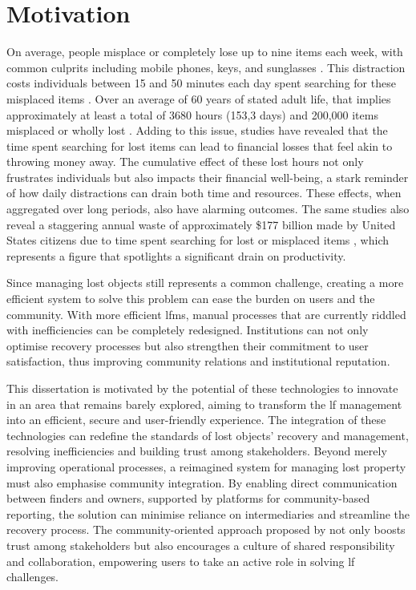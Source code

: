 \section{Motivation} \label{section:motivation}

On average, people misplace or completely lose up to nine items each week, with common culprits including mobile phones, keys, and sunglasses \cite{Prawira2024}. This distraction costs individuals between 15 and 50 minutes each day spent searching for these misplaced items \cites{Prawira2024, Knierim2012}. Over an average of 60 years of stated adult life, that implies approximately at least a total of 3680 hours (153,3 days) and 200,000 items misplaced or wholly lost \cite{Ahmad2015}. Adding to this issue, studies have revealed that the time spent searching for lost items can lead to financial losses that feel akin to throwing money away. The cumulative effect of these lost hours not only frustrates individuals but also impacts their financial well-being, a stark reminder of how daily distractions can drain both time and resources. These effects, when aggregated over long periods, also have alarming outcomes. The same studies also reveal a staggering annual waste of approximately \$177 billion made by United States citizens \cite{Newswire2010} due to time spent searching for lost or misplaced items \cite{Ahmad2015}, which represents a figure that spotlights a significant drain on productivity.

Since managing lost objects still represents a common challenge, creating a more efficient system to solve this problem can ease the burden on users and the community. With more efficient \ac{lfms}, manual processes that are currently riddled with inefficiencies can be completely redesigned. Institutions can not only optimise recovery processes but also strengthen their commitment to user satisfaction, thus improving community relations and institutional reputation.

This dissertation is motivated by the potential of these technologies to innovate in an area that remains barely explored, aiming to transform the \ac{lf} management into an efficient, secure and user-friendly experience. The integration of these technologies can redefine the standards of lost objects' recovery and management, resolving inefficiencies and building trust among stakeholders. Beyond merely improving operational processes, a reimagined system for managing lost property must also emphasise community integration. By enabling direct communication between finders and owners, supported by platforms for community-based reporting, the solution can minimise reliance on intermediaries and streamline the recovery process. The community-oriented approach proposed by  not only boosts trust among stakeholders but also encourages a culture of shared responsibility and collaboration, empowering users to take an active role in solving \ac{lf} challenges.

